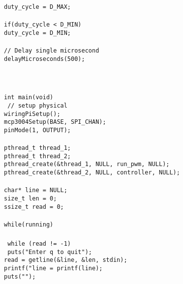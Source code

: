 \documentclass[a4paper, 12pt]{article}
\begin{document}
\begin{appendices}
{{	\texttt{duty\_cycle = D\_MAX;} \\\noindent
	\texttt{ \\\noindent}
	\texttt{if(duty\_cycle < D\_MIN)} \\\noindent
	\texttt{duty\_cycle = D\_MIN;} \\\noindent
	\texttt{ \\\noindent}
	\texttt{// Delay single microsecond} \\\noindent
	\texttt{delayMicroseconds(500);} \\\noindent
	\texttt{}} \\\noindent
	\texttt{}} \\\noindent
	\texttt{ \\\noindent}
	\texttt{int main(void) { \\\noindent}
	\texttt{// setup physical} \\\noindent
	\texttt{wiringPiSetup();} \\\noindent
	\texttt{mcp3004Setup(BASE, SPI\_CHAN);} \\\noindent
	\texttt{pinMode(1, OUTPUT); } \\\noindent
	\texttt{ \\\noindent}
	\texttt{pthread\_t thread\_1;} \\\noindent
	\texttt{pthread\_t thread\_2;} \\\noindent
	\texttt{pthread\_create(&thread\_1, NULL, run\_pwm, NULL);} \\\noindent
	\texttt{pthread\_create(&thread\_2, NULL, controller, NULL);} \\\noindent
	\texttt{ \\\noindent}
	\texttt{char* line = NULL;} \\\noindent
	\texttt{size\_t len = 0;} \\\noindent
	\texttt{ssize\_t read = 0;} \\\noindent
	\texttt{ \\\noindent}
	\texttt{while(running)} \\\noindent
	\texttt{{ \\\noindent}
	\texttt{while (read != -1) { \\\noindent}
	\texttt{puts("Enter q to quit");} \\\noindent
	\texttt{read = getline(&line, &len, stdin);} \\\noindent
	\texttt{printf("line = %
	\texttt{printf(line);} \\\noindent
	\texttt{puts("");} \\\noindent
}}}}
\end{appendices}
\end{document}
